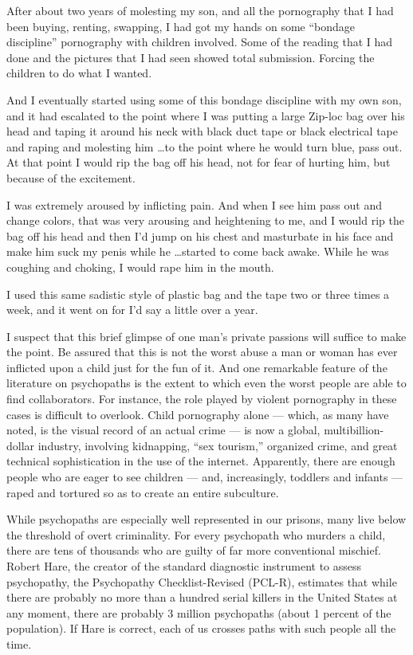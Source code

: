 \documentclass[a4paper,14pt]{extbook}
\begin{document}
After about two years of molesting my son, and all the pornography that I had been buying, renting, swapping, I had got my hands on some ``bondage discipline'' pornography with children involved.
Some of the reading that I had done and the pictures that I had seen showed total submission.
Forcing the children to do what I wanted.

And I eventually started using some of this bondage discipline with my own son, and it had escalated to the point where I was putting a large Zip-loc bag over his head and taping it around his neck with black duct tape or black electrical tape and raping and molesting him \dots to the point where he would turn blue, pass out.
At that point I would rip the bag off his head, not for fear of hurting him, but because of the excitement.

I was extremely aroused by inflicting pain.
And when I see him pass out and change colors, that was very arousing and heightening to me, and I would rip the bag off his head and then I’d jump on his chest and masturbate in his face and make him suck my penis while he \dots started to come back awake.
While he was coughing and choking, I would rape him in the mouth.

I used this same sadistic style of plastic bag and the tape two or three times a week, and it went on for I’d say a little over a year.

I suspect that this brief glimpse of one man’s private passions will suffice to make the point.
Be assured that this is not the worst abuse a man or woman has ever inflicted upon a child just for the fun of it.
And one remarkable feature of the literature on psychopaths is the extent to which even the worst people are able to find collaborators.
For instance, the role played by violent pornography in these cases is difficult to overlook.
Child pornography alone --- which, as many have noted, is the visual record of an actual crime --- is now a global, multibillion-dollar industry, involving kidnapping, ``sex tourism,'' organized crime, and great technical sophistication in the use of the internet.
Apparently, there are enough people who are eager to see children --- and, increasingly, toddlers and infants --- raped and tortured so as to create an entire subculture.

While psychopaths are especially well represented in our prisons, many live below the threshold of overt criminality.
For every psychopath who murders a child, there are tens of thousands who are guilty of far more conventional mischief.
Robert Hare, the creator of the standard diagnostic instrument to assess psychopathy, the Psychopathy Checklist-Revised (PCL-R), estimates that while there are probably no more than a hundred serial killers in the United States at any moment, there are probably 3 million psychopaths (about 1 percent of the population).
If Hare is correct, each of us crosses paths with such people all the time.
\end{document}
